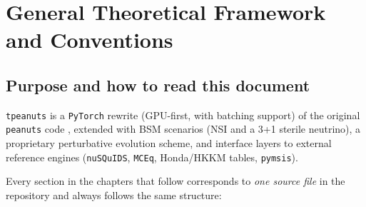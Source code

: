 \chapter{General Theoretical Framework and Conventions}
\label{ch:intro}

\let\savedmoduleheadchOne\modulehead
\renewcommand{\modulehead}[2]{%
  \noindent\pkgpath{#1}\par
  \noindent#2\par\medskip
}

\section{Purpose and how to read this document}

\texttt{tpeanuts} is a \texttt{PyTorch} rewrite (GPU-first, with batching
support) of the original \texttt{peanuts} code \parencite{LucentePeanuts},
extended with BSM scenarios (NSI and a 3+1 sterile neutrino), a proprietary
perturbative evolution scheme, and interface layers to external reference
engines (\texttt{nuSQuIDS}, \texttt{MCEq}, Honda/HKKM tables,
\texttt{pymsis}).

Every section in the chapters that follow corresponds to \emph{one source
file} in the repository and always follows the same structure:

